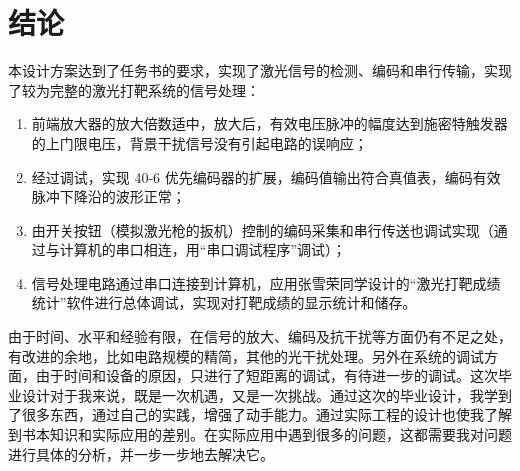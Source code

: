 \chapter{结论}

本设计方案达到了任务书的要求，实现了激光信号的检测、编码和串行传输，实现了较为完整的激光打靶系统的信号处理：
\begin{enumerate}
  \item 前端放大器的放大倍数适中，放大后，有效电压脉冲的幅度达到施密特触发器的上门限电压，背景干扰信号没有引起电路的误响应；
  \item 经过调试，实现 40-6 优先编码器的扩展，编码值输出符合真值表，编码有效脉冲下降沿的波形正常；
  \item 由开关按钮（模拟激光枪的扳机）控制的编码采集和串行传送也调试实现（通过与计算机的串口相连，用``串口调试程序''调试）；
  \item 信号处理电路通过串口连接到计算机，应用张雪荣同学设计的``激光打靶成绩统计''软件进行总体调试，实现对打靶成绩的显示统计和储存。
\end{enumerate}

由于时间、水平和经验有限，在信号的放大、编码及抗干扰等方面仍有不足之处，有改进的余地，比如电路规模的精简，其他的光干扰处理。另外在系统的调试方面，由于时间和设备的原因，只进行了短距离的调试，有待进一步的调试。这次毕业设计对于我来说，既是一次机遇，又是一次挑战。通过这次的毕业设计，我学到了很多东西，通过自己的实践，增强了动手能力。通过实际工程的设计也使我了解到书本知识和实际应用的差别。在实际应用中遇到很多的问题，这都需要我对问题进行具体的分析，并一步一步地去解决它。